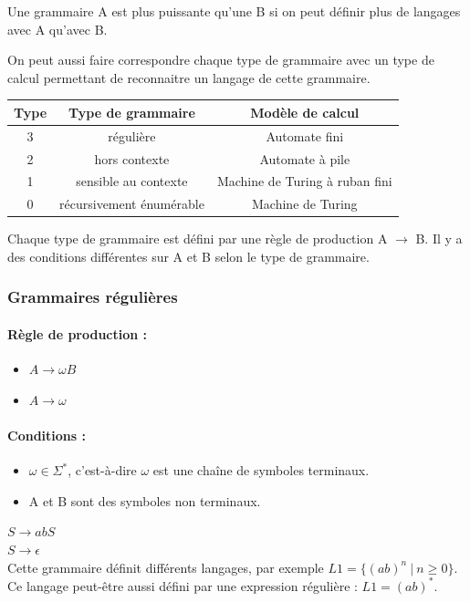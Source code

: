 \begin{mydef}
	Une grammaire A est plus puissante qu'une B si on peut définir plus 
	de langages avec A qu'avec B.
\end{mydef}

On peut aussi faire correspondre chaque type de grammaire avec un type de 
calcul permettant de reconnaitre un langage de cette grammaire.

\begin{tabular}{|c|c|c|}
	\hline	
	 Type & Type de grammaire & Modèle de calcul\\
	 \hline
	3 & régulière & Automate fini \\
	 \hline
	2 & hors contexte & Automate à pile \\
	 \hline
	1 & sensible au contexte & Machine de Turing à ruban fini \\
	 \hline
	0 & récursivement énumérable & Machine de Turing \\
	\hline
\end{tabular}

Chaque type de grammaire est défini par une règle de production A $\rightarrow 
$ B. Il y a des conditions différentes sur A et B selon le type de 
grammaire.

\subsubsection{Grammaires régulières}
\paragraph{Règle de production :} 
\begin{itemize}
	\item $A \rightarrow \omega B$
	\item $A \rightarrow \omega$
\end{itemize}

\paragraph{Conditions :}
\begin{itemize}
	\item  $\omega \in \Sigma^*$, c'est-à-dire $\omega$ est une chaîne de symboles 
	terminaux. 
	\item A et B sont des symboles non terminaux.
\end{itemize}

\begin{myexem}
	$S \rightarrow abS$ \\
	$S \rightarrow \epsilon$ \\
	Cette grammaire définit différents langages, par exemple $L1 = 
	\{(ab)^n \ | \ n \geq 0\}$. Ce langage peut-être aussi défini par une expression 
	régulière : $L1 = (ab)^*$.
\end{myexem}

